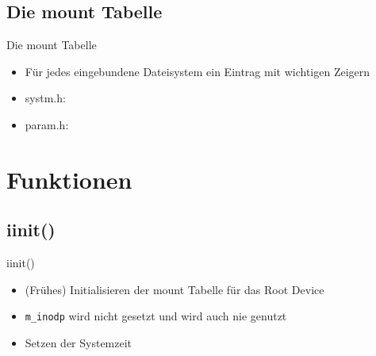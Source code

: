 \documentclass{beamer}
\begin{document}


\subsection{Die mount Tabelle}

\begin{frame}{Die mount Tabelle}
    \begin{itemize}
        \item Für jedes eingebundene Dateisystem ein Eintrag mit wichtigen Zeigern

        \bigskip

        \item systm.h:
            \smallskip
            

        \bigskip

        \item param.h:
            \smallskip
            
    \end{itemize}
\end{frame}




\section{Funktionen}

\begin{frame}[plain]
    \sectionpage
\end{frame}




\subsection{iinit()}

\begin{frame}{iinit()}
    \begin{itemize}
        \item (Frühes) Initialisieren der mount Tabelle für das Root Device
        \item \texttt{m\_inodp} wird nicht gesetzt und wird auch nie genutzt
        \item Setzen der Systemzeit
    \end{itemize}
\end{frame}
\end{document}
